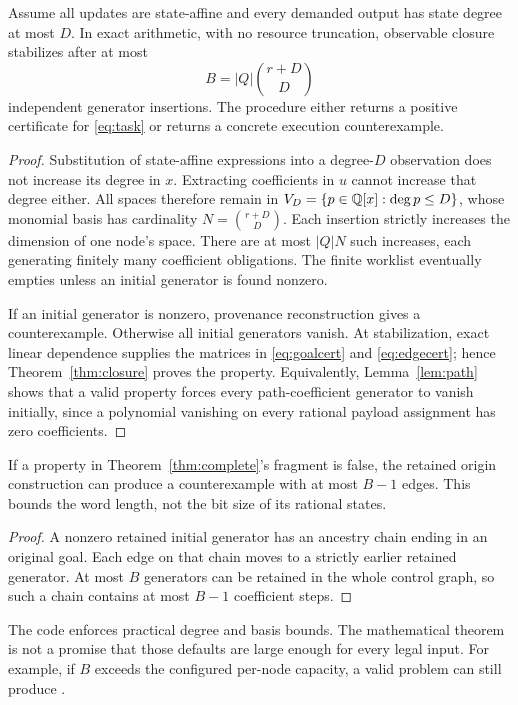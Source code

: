 \begin{theorem}\label{thm:complete}
Assume all updates are state-affine and every demanded output has state degree
at most $D$. In exact arithmetic, with no resource truncation, observable
closure stabilizes after at most
\[
 B=|Q|\binom{r+D}{D}
\]
independent generator insertions. The procedure either returns a positive
certificate for \eqref{eq:task} or returns a concrete execution counterexample.
\end{theorem}
\begin{proof}
Substitution of state-affine expressions into a degree-$D$ observation does not
increase its degree in $x$. Extracting coefficients in $u$ cannot increase that
degree either. All spaces therefore remain in
$V_D=\{p\in\mathbb Q[x]:\deg p\le D\}$, whose monomial basis has cardinality
$N=\binom{r+D}{D}$. Each insertion strictly increases the dimension of one
node's space. There are at most $|Q|N$ such increases, each generating finitely
many coefficient obligations. The finite worklist eventually empties unless
an initial generator is found nonzero.

If an initial generator is nonzero, provenance reconstruction gives a
counterexample. Otherwise all initial generators vanish. At stabilization,
exact linear dependence supplies the matrices in \eqref{eq:goalcert} and
\eqref{eq:edgecert}; hence Theorem~\ref{thm:closure} proves the property.
Equivalently, Lemma~\ref{lem:path} shows that a valid property forces every
path-coefficient generator to vanish initially, since a polynomial vanishing
on every rational payload assignment has zero coefficients.
\end{proof}

\begin{corollary}
If a property in Theorem~\ref{thm:complete}'s fragment is false, the retained
origin construction can produce a counterexample with at most $B-1$ edges.
This bounds the word length, not the bit size of its rational states.
\end{corollary}
\begin{proof}
A nonzero retained initial generator has an ancestry chain ending in an
original goal. Each edge on that chain moves to a strictly earlier retained
generator. At most $B$ generators can be retained in the whole control graph,
so such a chain contains at most $B-1$ coefficient steps.
\end{proof}

The code enforces practical degree and basis bounds. The mathematical theorem
is not a promise that those defaults are large enough for every legal input.
For example, if $B$ exceeds the configured per-node capacity, a valid problem
can still produce \unknown{}.

